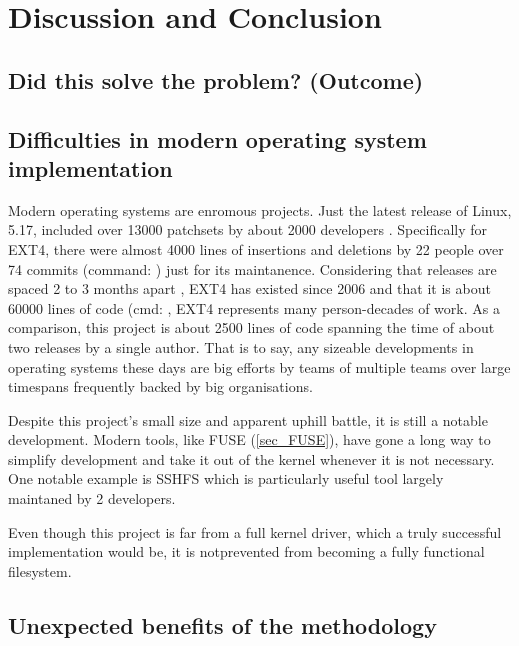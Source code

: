 \chapter{Discussion and Conclusion}

    \section{Did this solve the problem? (Outcome)}

    \section{Difficulties in modern operating system implementation}

        Modern operating systems are enromous projects. Just the latest release
        of Linux, 5.17, included over 13000 patchsets by about 2000 developers
        \cite{Linux_dev_count}.  Specifically for EXT4, there were almost 4000
        lines of insertions and deletions by 22 people over 74 commits
        (command: ) just for
        its maintanence. Considering that releases are spaced 2 to 3 months
        apart \cite{Linux_dev_process}, EXT4 has existed since 2006
        \cite{ext4_origin} and that it is about 60000 lines of code (cmd:
        , EXT4 represents many person-decades of work.
        As a comparison, this project is about 2500 lines of code spanning the
        time of about two releases by a single author. That is to say, any
        sizeable developments in operating systems these days are big efforts
        by teams of multiple teams over large timespans frequently backed by
        big organisations.

        Despite this project's small size and apparent uphill battle, it is
        still a notable development. Modern tools, like FUSE (\ref{sec_FUSE}),
        have gone a long way to simplify development and take it out of the
        kernel whenever it is not necessary. One notable example is SSHFS
        \cite{SSHFS} which is particularly useful
        tool largely maintaned by 2 developers.

        Even though this project is far from a full kernel driver, which a
        truly successful implementation would be, it is notprevented from
        becoming a fully functional filesystem.

    \section{Unexpected benefits of the methodology}

